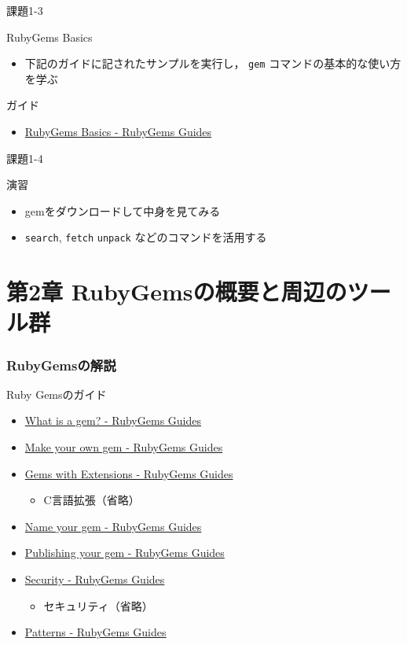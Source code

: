 \documentclass[t, aspectratio=169]{beamer}
\begin{document}
\begin{frame}[fragile,label=sec-1-5-3]{課題1-3}
 \begin{block}{RubyGems Basics}
\begin{itemize}
\item 下記のガイドに記されたサンプルを実行し，
\texttt{gem} コマンドの基本的な使い方を学ぶ
\end{itemize}
\end{block}
\begin{block}{ガイド}
\begin{itemize}
\item \href{http://guides.rubygems.org/rubygems-basics/}{RubyGems Basics - RubyGems Guides}
\end{itemize}
\end{block}
\end{frame}
\begin{frame}[fragile,label=sec-1-5-4]{課題1-4}
 \begin{block}{演習}
\begin{itemize}
\item gemをダウンロードして中身を見てみる
\item \texttt{search}, \texttt{fetch} \texttt{unpack} などのコマンドを活用する
\end{itemize}
\end{block}
\end{frame}
\part{第2章 RubyGemsの概要と周辺のツール群}
\label{sec-2}
\section{RubyGemsの解説}
\label{sec-2-1}
\begin{frame}[label=sec-2-1-1]{Ruby Gemsのガイド}
\begin{itemize}
\item \href{http://guides.rubygems.org/what-is-a-gem/}{What is a gem? - RubyGems Guides}
\item \href{http://guides.rubygems.org/make-your-own-gem/}{Make your own gem - RubyGems Guides}
\item \href{http://guides.rubygems.org/gems-with-extensions/}{Gems with Extensions - RubyGems Guides}
\begin{itemize}
\item C言語拡張（省略）
\end{itemize}
\item \href{http://guides.rubygems.org/name-your-gem/}{Name your gem - RubyGems Guides}
\item \href{http://guides.rubygems.org/publishing/}{Publishing your gem - RubyGems Guides}
\item \href{http://guides.rubygems.org/security/}{Security - RubyGems Guides}
\begin{itemize}
\item セキュリティ（省略）
\end{itemize}
\item \href{http://guides.rubygems.org/patterns/}{Patterns - RubyGems Guides}
\end{itemize}
\end{frame}
\end{document}
